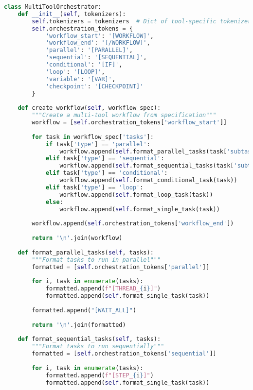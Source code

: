 \begin{lstlisting}[language=Python, caption=Multi-tool orchestration system]
class MultiToolOrchestrator:
    def __init__(self, tokenizers):
        self.tokenizers = tokenizers  # Dict of tool-specific tokenizers
        self.orchestration_tokens = {
            'workflow_start': '[WORKFLOW]',
            'workflow_end': '[/WORKFLOW]',
            'parallel': '[PARALLEL]',
            'sequential': '[SEQUENTIAL]',
            'conditional': '[IF]',
            'loop': '[LOOP]',
            'variable': '[VAR]',
            'checkpoint': '[CHECKPOINT]'
        }
        
    def create_workflow(self, workflow_spec):
        """Create a multi-tool workflow from specification"""
        workflow = [self.orchestration_tokens['workflow_start']]
        
        for task in workflow_spec['tasks']:
            if task['type'] == 'parallel':
                workflow.append(self.format_parallel_tasks(task['subtasks']))
            elif task['type'] == 'sequential':
                workflow.append(self.format_sequential_tasks(task['subtasks']))
            elif task['type'] == 'conditional':
                workflow.append(self.format_conditional_task(task))
            elif task['type'] == 'loop':
                workflow.append(self.format_loop_task(task))
            else:
                workflow.append(self.format_single_task(task))
        
        workflow.append(self.orchestration_tokens['workflow_end'])
        
        return '\n'.join(workflow)
    
    def format_parallel_tasks(self, tasks):
        """Format tasks to run in parallel"""
        formatted = [self.orchestration_tokens['parallel']]
        
        for i, task in enumerate(tasks):
            formatted.append(f"[THREAD_{i}]")
            formatted.append(self.format_single_task(task))
        
        formatted.append("[WAIT_ALL]")
        
        return '\n'.join(formatted)
    
    def format_sequential_tasks(self, tasks):
        """Format tasks to run sequentially"""
        formatted = [self.orchestration_tokens['sequential']]
        
        for i, task in enumerate(tasks):
            formatted.append(f"[STEP_{i}]")
            formatted.append(self.format_single_task(task))
            

\end{lstlisting}
